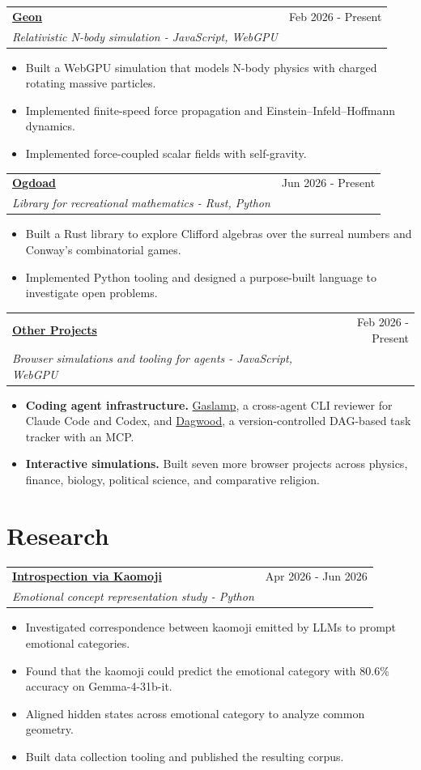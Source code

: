 \documentclass[10pt,letterpaper]{article}
\makeatletter
\newcommand{\entry}[4]{%
  \noindent\begin{tabularx}{\linewidth}{@{}X r@{}}
    \textbf{\href{#2}{#1}} & \textcolor{muted}{\small #4} \\
    \textit{#3} & \\
  \end{tabularx}\vspace{-1pt}%
}
\makeatother
\begin{document}
\entry{Geon}{https://a9l.im/geon}{Relativistic N-body simulation - JavaScript, WebGPU}{Feb 2026 - Present}
\begin{itemize}
  \item Built a WebGPU simulation that models N-body physics with charged rotating massive particles.
  \item Implemented finite-speed force propagation and Einstein–Infeld–Hoffmann dynamics.
  \item Implemented force-coupled scalar fields with self-gravity.
\end{itemize}

\entry{Ogdoad}{https://a9l.im/ogdoad}{Library for recreational mathematics - Rust, Python}{Jun 2026 - Present}
\begin{itemize}
  \item Built a Rust library to explore Clifford algebras over the surreal numbers and Conway's combinatorial games.
  \item Implemented Python tooling and designed a purpose-built language to investigate open problems.
\end{itemize}

\entry{Other Projects}{https://a9l.im/}{Browser simulations and tooling for agents - JavaScript, WebGPU}{Feb 2026 - Present}
\begin{itemize}
  \item \textbf{Coding agent infrastructure.} \href{https://github.com/a9lim/gaslamp}{Gaslamp}, a
  cross-agent CLI reviewer for Claude Code and Codex, and \href{https://github.com/a9lim/dagwood}{Dagwood},
  a version-controlled DAG-based task tracker with an MCP.
  \item \textbf{Interactive simulations.} Built seven more browser projects across physics,
  finance, biology, political science, and comparative religion.
\end{itemize}

\section*{Research}

\entry{Introspection via Kaomoji}{https://a9l.im/blog/introspection-via-kaomoji}{Emotional concept representation study - Python}{Apr 2026 - Jun 2026}
\begin{itemize}
  \item Investigated correspondence between kaomoji emitted by LLMs to prompt emotional categories.
  \item Found that the kaomoji could predict the emotional category with 80.6\% accuracy on Gemma-4-31b-it.
  \item Aligned hidden states across emotional category to analyze common geometry.
  \item Built data collection tooling and published the resulting corpus.
\end{itemize}
\end{document}
